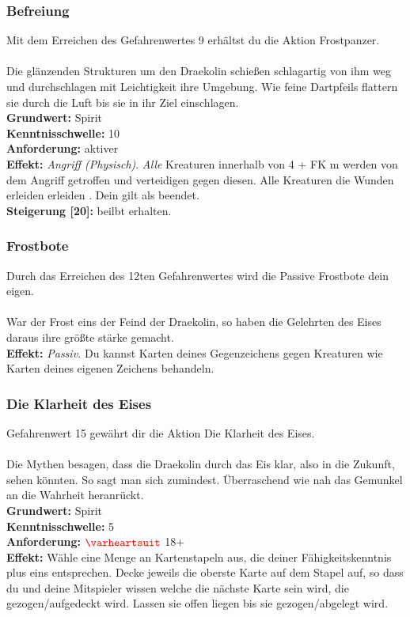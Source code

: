 \subsubsection*{ Befreiung} \label{sk:befreiung}
Mit dem Erreichen des Gefahrenwertes 9 erhältst du die Aktion Frostpanzer.\\
\\
Die glänzenden Strukturen um den Draekolin schießen schlagartig von ihm weg und durchschlagen mit Leichtigkeit ihre Umgebung. Wie feine Dartpfeils flattern sie durch die Luft bis sie in ihr Ziel einschlagen. \\
\textbf{Grundwert:} Spirit \\
\textbf{Kenntnisschwelle:} 10 \\
\textbf{Anforderung:} aktiver \textit{}\\
\textbf{Effekt:} \textit{Angriff (Physisch)}. \textit{Alle} Kreaturen innerhalb von 4 + FK m werden von dem Angriff getroffen und verteidigen gegen diesen. Alle Kreaturen die Wunden erleiden erleiden . Dein \textit{} gilt als beendet.\\
\textbf{Steigerung [20]:}  beilbt erhalten.

\subsubsection*{ Frostbote} \label{sk:forstbote}
Durch das Erreichen des 12ten Gefahrenwertes wird die Passive Frostbote dein eigen.\\
\\
War der Frost eins der Feind der Draekolin, so haben die Gelehrten des Eises daraus ihre größte stärke gemacht. \\
\textbf{Effekt:} \textit{Passiv.} Du kannst Karten deines Gegenzeichens gegen  Kreaturen wie Karten deines eigenen Zeichens behandeln.

\subsubsection*{ Die Klarheit des Eises} \label{sk:dieklarheitdeseises}
Gefahrenwert 15 gewährt dir die Aktion Die Klarheit des Eises.\\
\\
Die Mythen besagen, dass die Draekolin durch das Eis klar, also in die Zukunft, sehen könnten. So sagt man sich zumindest. Überraschend wie nah das Gemunkel an die Wahrheit heranrückt. \\
\textbf{Grundwert:} Spirit \\
\textbf{Kenntnisschwelle:} 5 \\
\textbf{Anforderung:} $\Herz{}$ 18+ \\
\textbf{Effekt:} Wähle eine Menge an Kartenstapeln aus, die deiner Fähigkeitskenntnis plus eins entsprechen. Decke jeweils die oberste Karte auf dem Stapel auf, so dass du und deine Mitspieler wissen welche die nächste Karte sein wird, die gezogen/aufgedeckt wird. Lassen sie offen liegen bis sie gezogen/abgelegt wird.


